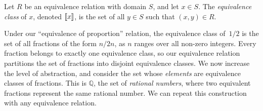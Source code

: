 \documentclass[../generics]{subfiles}
\begin{document}
\begin{definition}
Let $R$ be an equivalence relation with domain $S$, and let $x\in S$. The \emph{equivalence class} of $x$, denoted $[\![x]\!]$, is the set of all $y\in S$ such that $(x, y)\in R$.
\end{definition}

Under our ``equivalence of proportion'' relation, the equivalence class of~$1/2$ is the set of all fractions of the form $n/2n$, as $n$ ranges over all non-zero integers. Every fraction belongs to exactly one equivalence class, so our equivalence relation partitions the set of fractions into disjoint equivalence classes. We now increase the level of abstraction, and consider the set whose \emph{elements} are equivalence classes of fractions. This is $\mathbb{Q}$, the set of \emph{rational numbers}, where two equivalent fractions represent the same rational number. We can repeat this construction with any equivalence relation.
\end{document}
